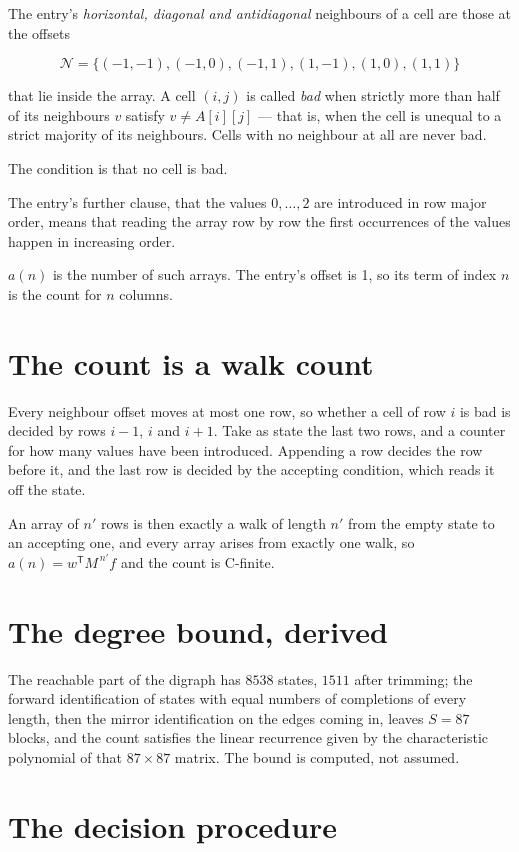 \documentclass[11pt]{article}
\theoremstyle{definition}
\begin{document}
The entry's {\itshape horizontal, diagonal and antidiagonal} neighbours of a cell are those at the offsets

\[\mathcal{N} = \{(-1,-1), (-1,0), (-1,1), (1,-1), (1,0), (1,1)\}\]

that lie inside the array. A cell $(i,j)$ is called {\itshape bad} when strictly more than half of its neighbours $v$ satisfy $v \ne A[i][j]$ --- that is, when the cell is unequal to a strict majority of its neighbours. Cells with no neighbour at all are never bad.

The condition is that no cell is bad.

The entry's further clause, that the values $0,\dots,2$ are introduced in row major order, means that reading the array row by row the first occurrences of the values happen in increasing order.

$a(n)$ is the number of such arrays. The entry's offset is 1, so its term of index $n$ is the count for $n$ columns.

\section{The count is a walk count}

Every neighbour offset moves at most one row, so whether a cell of row $i$ is bad is decided by rows $i-1$, $i$ and $i+1$. Take as state the last two rows, and a counter for how many values have been introduced. Appending a row decides the row before it, and the last row is decided by the accepting condition, which reads it off the state.

An array of $n'$ rows is then exactly a walk of length $n'$ from the empty state to an accepting one, and every array arises from exactly one walk, so $a(n) = w^{\mathsf T}M^{\,n'}f$ and the count is C-finite.

\section{The degree bound, derived}

The reachable part of the digraph has $8538$ states, $1511$ after trimming; the forward identification of states with equal numbers of completions of every length, then the mirror identification on the edges coming in, leaves $S = 87$ blocks, and the count satisfies the linear recurrence given by the characteristic polynomial of that $87\times87$ matrix. The bound is computed, not assumed.

\section{The decision procedure}
\end{document}
